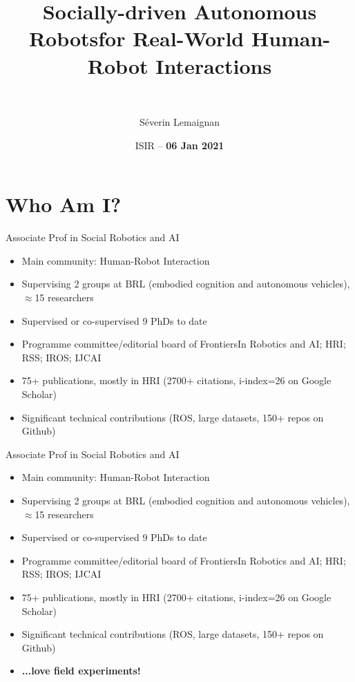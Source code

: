 \documentclass[xcolor=table]{beamer}
\title{\Large Socially-driven Autonomous Robots\newline for Real-World Human-Robot Interactions}
\subtitle{~}
\date{ISIR -- {\bf 06 Jan 2021}}
\author{Séverin Lemaignan}
\institute{Bristol Robotics Lab\\{\bf University of the West of England}}
\begin{document}



\maketitle


\section*{Who Am I?}




\begin{frame}{Associate Prof in Social Robotics and AI}
    \begin{itemize}
        \item Main community: Human-Robot Interaction
        \item Supervising 2 groups at BRL (embodied cognition and autonomous
            vehicles), $\approx$15 researchers
        \item Supervised or co-supervised 9 PhDs to date
        \item Programme committee/editorial board of FrontiersIn Robotics and
            AI; HRI; RSS; IROS; IJCAI
        \item 75+ publications, mostly in HRI (2700+ citations, i-index=26 on Google Scholar)
        \item Significant technical contributions (ROS, large datasets, 150+
            repos on Github)
    \end{itemize}

\end{frame}



\begin{frame}{Associate Prof in Social Robotics and AI}
    \begin{itemize}
        \item Main community: Human-Robot Interaction
        \item Supervising 2 groups at BRL (embodied cognition and autonomous
            vehicles), $\approx$15 researchers
        \item Supervised or co-supervised 9 PhDs to date
        \item Programme committee/editorial board of FrontiersIn Robotics and
            AI; HRI; RSS; IROS; IJCAI
        \item 75+ publications, mostly in HRI (2700+ citations, i-index=26 on Google Scholar)
        \item Significant technical contributions (ROS, large datasets, 150+
            repos on Github)
        \item \bf ...love field experiments!
    \end{itemize}

\end{frame}
\end{document}
